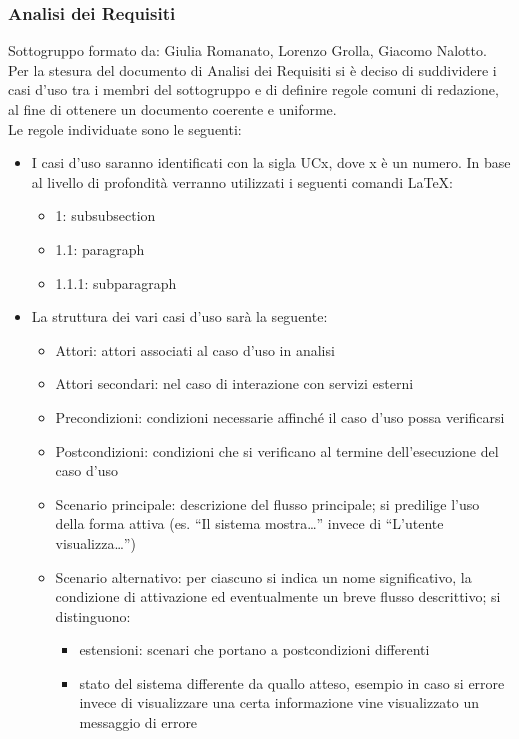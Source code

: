 \documentclass[a4paper, 11pt]{article}
\begin{document}
\subsubsection{Analisi dei Requisiti}
Sottogruppo formato da: Giulia Romanato, Lorenzo Grolla, Giacomo Nalotto.\\
Per la stesura del documento di Analisi dei Requisiti si è deciso di suddividere i casi d'uso tra i membri del sottogruppo e di definire regole comuni di redazione, al fine di ottenere un documento coerente e uniforme.\\
Le regole individuate sono le seguenti:
\begin{itemize}
    \item I casi d'uso saranno identificati con la sigla UCx, dove x è un numero. In base al livello di profondità verranno utilizzati i seguenti comandi LaTeX:
    \begin{itemize}
        \item 1: subsubsection
        \item 1.1: paragraph
        \item 1.1.1: subparagraph 
    \end{itemize}
    \item La struttura dei vari casi d'uso sarà la seguente:
    \begin{itemize}
        \item Attori: attori associati al caso d'uso in analisi
        \item Attori secondari: nel caso di interazione con servizi esterni
        \item Precondizioni: condizioni necessarie affinché il caso d'uso possa verificarsi
        \item Postcondizioni: condizioni che si verificano al termine dell'esecuzione del caso d'uso
        \item Scenario principale: descrizione del flusso principale; si predilige l'uso della forma attiva (es. “Il sistema mostra…” invece di “L'utente visualizza…”)
        \item Scenario alternativo: per ciascuno si indica un nome significativo, la condizione di attivazione ed eventualmente un breve flusso descrittivo; si distinguono:
        \begin{itemize}
            \item estensioni: scenari che portano a postcondizioni differenti
            \item stato del sistema differente da quallo atteso, esempio in caso si errore invece di visualizzare una certa informazione vine visualizzato un messaggio di errore

\end{itemize}
\end{itemize}
\end{itemize}
\end{document}
